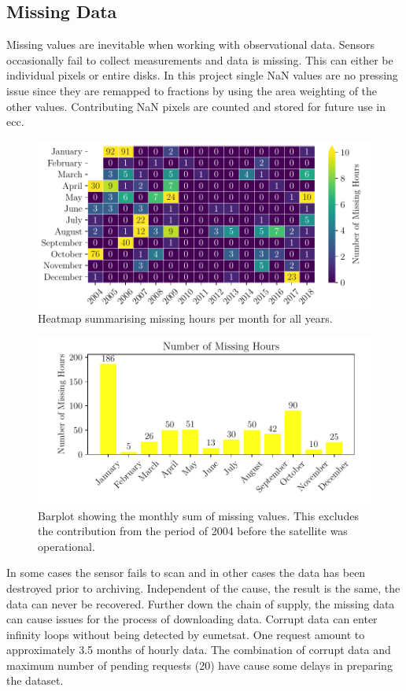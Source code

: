 \subsection{Missing Data} \label{sec:missing_values}
Missing values are inevitable when working with observational data. Sensors occasionally fail to collect measurements and data is missing. This can either be individual pixels or entire disks. In this project single NaN values are no pressing issue since they are remapped to fractions by using the area weighting of the other values. Contributing NaN pixels are counted and stored for future use in \acrshort{ecc}.
\begin{figure}
    \centering
    \includegraphics[scale = 1.0]{python_figs/heatmap_missing_values.pdf}
    \caption{Heatmap summarising missing hours per month for all years.}
    \label{fig:heatmap_missing_values}
\end{figure}
\begin{figure}
    \centering
    \includegraphics[scale = 1.0]{python_figs/heatmap_missing_values_monthly_sum.pdf}
    \caption{Barplot showing the monthly sum of missing values. This excludes the contribution from the period of 2004 before the satellite was operational.}
    \label{fig:barplot_missing_values}
\end{figure}
In some cases the sensor fails to scan and in other cases the data has been destroyed prior to archiving. Independent of the cause, the result is the same, the data can never be recovered. Further down the chain of supply, the missing data can cause issues for the process of downloading data. Corrupt data can enter infinity loops without being detected by \acrshort{eumetsat}. One request amount to approximately 3.5 months of hourly data. The combination of corrupt data and maximum number of pending requests (20) have cause some delays in preparing the dataset. 

